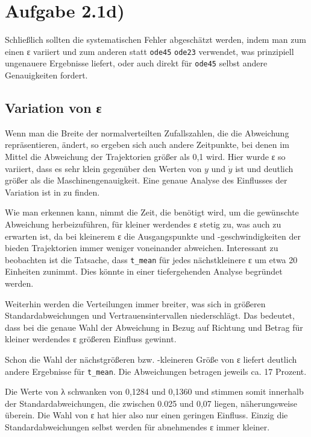 \section*{Aufgabe 2.1d)}
Schließlich sollten die systematischen Fehler abgeschätzt werden, indem man zum
einen ε variiert und zum anderen statt \texttt{ode45} \texttt{ode23} verwendet,
was prinzipiell ungenauere Ergebnisse liefert, oder auch direkt für
\texttt{ode45} selbst andere Genauigkeiten fordert.

\subsection*{Variation von ε}
Wenn man die Breite der normalverteilten Zufallszahlen, die die Abweichung
repräsentieren, ändert, so ergeben sich auch andere Zeitpunkte, bei denen im 
Mittel die Abweichung der Trajektorien größer als 0,1 wird. Hier wurde ε so
variiert, dass es sehr klein gegenüber den Werten von $y$ und $\dot{y}$ ist und
deutlich größer als die Maschinengenauigkeit. Eine genaue Analyse des Einflusses 
der Variation ist in  zu finden.



Wie man erkennen kann, nimmt die Zeit, die benötigt wird, um die gewünschte 
Abweichung herbeizuführen, für kleiner werdendes ε stetig zu, was auch zu
erwarten ist, da bei kleinerem ε die Ausgangspunkte und -geschwindigkeiten der
bieden Trajektorien immer weniger voneinander abweichen. Interessant zu beobachten
ist die Tatsache, dass \texttt{t\_mean} für jedes nächstkleinere ε um etwa 20
Einheiten zunimmt. Dies könnte in einer tiefergehenden Analyse begründet werden.

Weiterhin werden die 
Verteilungen immer breiter, was sich in größeren Standardabweichungen und
Vertrauensintervallen niederschlägt. Das bedeutet, dass bei die genaue Wahl der
Abweichung in Bezug auf Richtung und Betrag für kleiner werdendes ε größeren
Einfluss gewinnt.

Schon die Wahl der nächstgrößeren bzw. -kleineren Größe von ε liefert deutlich
andere Ergebnisse für \texttt{t\_mean}. Die Abweichungen betragen jeweils ca.
17 Prozent. 

Die Werte von λ schwanken von 0,1284 und 0,1360 und stimmen somit innerhalb der
Standardabweichungen, die zwischen 0.025 und 0,07 liegen, näherungsweise überein.
Die Wahl von ε hat hier also nur einen geringen Einfluss. Einzig die
Standardabweichungen selbst werden für abnehmendes ε immer kleiner.

